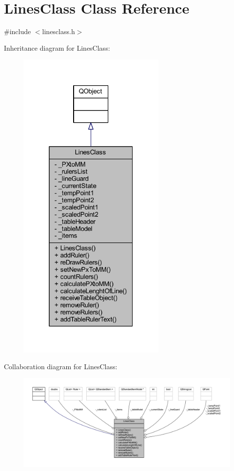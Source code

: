 \hypertarget{classLinesClass}{}\section{Lines\+Class Class Reference}
\label{classLinesClass}


{\ttfamily \#include $<$linesclass.\+h$>$}



Inheritance diagram for Lines\+Class\+:
\nopagebreak
\begin{figure}[H]
\begin{center}
\leavevmode
\includegraphics[width=208pt]{classLinesClass__inherit__graph}
\end{center}
\end{figure}


Collaboration diagram for Lines\+Class\+:
\nopagebreak
\begin{figure}[H]
\begin{center}
\leavevmode
\includegraphics[width=350pt]{classLinesClass__coll__graph}
\end{center}
\end{figure}
